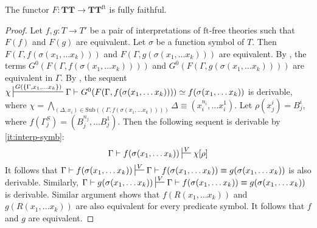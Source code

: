 \documentclass[reqno]{amsart}
\theoremstyle{definition}
\theoremstyle{remark}
\newcommand{\fs}[1]{\mathrm{#1}}
\newcommand{\ft}{\fs{ft}}
\newcommand{\sub}{\fs{Sub}}
\newcommand{\cat}[1]{\mathbf{#1}}
\newcommand{\algtt}{\cat{TT}}
\numberwithin{figure}{section}
\begin{document}
\begin{thm}
The functor $F : \algtt \to \algtt^\ft$ is fully faithful.
\end{thm}
\begin{proof}
Let $f,g : T \to T'$ be a pair of interpretations of $\ft$-free theories such that $F(f)$ and $F(g)$ are equivalent.
Let $\sigma$ be a function symbol of $T$.
Then $F(\Gamma, f(\sigma(x_1, \ldots x_k)))$ and $F(\Gamma, g(\sigma(x_1, \ldots x_k)))$ are equivalent.
By , the terms $G^0(F(\Gamma, f(\sigma(x_1, \ldots x_k))))$ and $G^0(F(\Gamma, g(\sigma(x_1, \ldots x_k))))$ are equivalent in $\Gamma$.
By , the sequent $\chi \sststile{}{G(\{ \Gamma, x_1, \ldots x_k \})} \Gamma \vdash G^0(F(\Gamma, f(\sigma(x_1, \ldots x_k)))) \simeq f(\sigma(x_1, \ldots x_k))$ is derivable,
where $\chi = \bigwedge_{(\Delta,x_i) \in \sub((\Gamma,f(\sigma(x_1, \ldots x_k))))} \Delta \equiv (x^{n_i}_i, \ldots x^1_i)$.
Let $\rho(x_j^i) = B_j^i$, where $f(\Gamma^S_j) = (B^{n_j}_j, \ldots B^1_j)$.
Then the following sequent is derivable by \eqref{it:interp-symb}:
\[ \Gamma \vdash f(\sigma(x_1, \ldots x_k)) \sststile{}{V} \chi[\rho] \]
It follows that $\Gamma \vdash f(\sigma(x_1, \ldots x_k)) \sststile{}{V} \Gamma \vdash f(\sigma(x_1, \ldots x_k)) \equiv g(\sigma(x_1, \ldots x_k))$ is also derivable.
Similarly, $\Gamma \vdash g(\sigma(x_1, \ldots x_k)) \sststile{}{V} \Gamma \vdash f(\sigma(x_1, \ldots x_k)) \equiv g(\sigma(x_1, \ldots x_k))$ is derivable.
Similar argument shows that $f(R(x_1, \ldots x_k))$ and $g(R(x_1, \ldots x_k))$ are also equivalent for every predicate symbol.
It follows that $f$ and $g$ are equivalent.


\end{proof}
\end{document}

